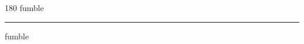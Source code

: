 
\begin{frame}
\begin{center}
\begin{turn}{180}
{\fontsize{2.5cm}{1em}\selectfont fumble}
\end{turn}
\vspace{1em}\par  
\hrule
\vspace{1em}\par  
{\fontsize{2.5cm}{1em}\selectfont fumble}
\end{center}
\end{frame}
